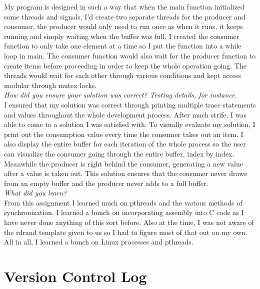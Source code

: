 \documentclass[letterpaper,10pt,titlepage]{article}
\begin{document}
My program is designed in such a way that when the main function initialized some threads and signals, I’d create two separate threads for the producer and consumer, the producer would only need to run once as when it runs, it keeps running and simply waiting when the buffer was full, I created the consumer function to only take one element at a time so I put the function into a while loop in main.  The consumer function would also wait for the producer function to create items before proceeding in order to keep the whole operation going.  The threads would wait for each other through various conditions and kept access modular through mutex locks.\\

\textit{How did you ensure your solution was correct? Testing details, for instance.}\\

I ensured that my solution was correct through printing multiple trace statements and values throughout the whole development process.  After much strife, I was able to come to a solution I was satisfied with.  To visually evaluate my solution, I print out the consumption value every time the consumer takes out an item.  I also display the entire buffer for each iteration of the whole process so the user can visualize the consumer going through the entire buffer, index by index.  Meanwhile the producer is right behind the consumer, generating a new value after a value is taken out.  This solution ensures that the consumer never draws from an empty buffer and the producer never adds to a full buffer.\\

\textit{What did you learn?}\\

From this assignment I learned much on pthreads and the various methods of synchronization.  I learned a bunch on incorporating assembly into C code as I have never done anything of this sort before.  Also at the time, I was not aware of the rdrand template given to us so I had to figure most of that out on my own.  All in all, I learned a bunch on Linux processes and pthreads.\\

\section{Version Control Log}
\end{document}
